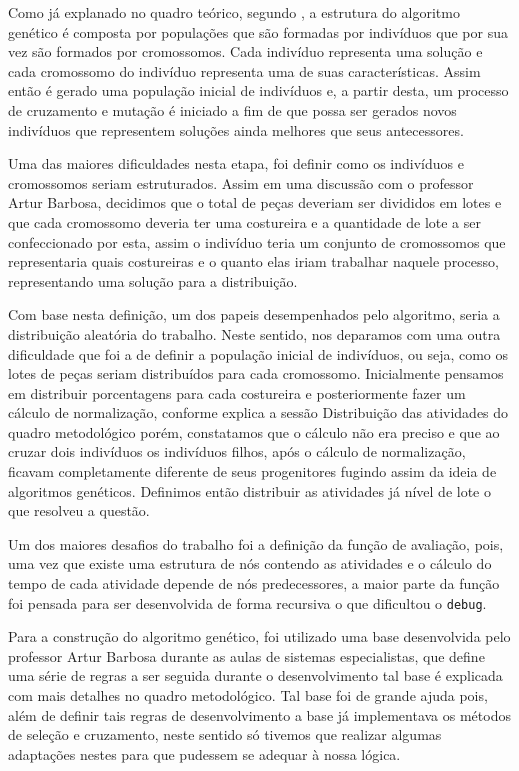 \par Como já explanado no quadro teórico, segundo , a estrutura do algoritmo genético é composta
por populações que são formadas por indivíduos que por sua vez são formados por cromossomos.
Cada indivíduo representa uma solução e cada cromossomo do indivíduo representa uma de suas características. 
Assim então é gerado uma população inicial de indivíduos e, a partir desta, um processo de cruzamento 
e mutação é iniciado a fim de que possa ser gerados novos indivíduos que representem soluções ainda melhores 
que seus antecessores.

\par Uma das maiores dificuldades nesta etapa, foi definir como os indivíduos e cromossomos seriam estruturados. Assim em uma discussão com o professor Artur Barbosa, decidimos que o total de peças deveriam ser divididos em lotes e que cada cromossomo deveria ter uma costureira 
e a quantidade de lote a ser confeccionado por esta, assim o indivíduo teria um conjunto de cromossomos que representaria quais costureiras 
e o quanto elas iriam trabalhar naquele processo, representando uma solução para a distribuição.

\par Com base nesta definição, um dos papeis desempenhados pelo algoritmo, seria a distribuição aleatória do trabalho. Neste
sentido, nos deparamos com uma outra dificuldade que foi a de definir a população inicial de indivíduos, ou seja, 
como os lotes de peças seriam distribuídos para cada cromossomo. Inicialmente pensamos em distribuir porcentagens para cada costureira
e posteriormente fazer um cálculo de normalização, conforme explica a sessão Distribuição das atividades do quadro metodológico porém,
constatamos que o cálculo não era preciso e que ao cruzar dois indivíduos os indivíduos filhos, após o cálculo de normalização, ficavam
completamente diferente de seus progenitores fugindo assim da ideia de algoritmos genéticos. Definimos então distribuir as atividades já 
nível de lote o que resolveu a questão. 

\par Um dos maiores desafios do trabalho foi a definição da função de avaliação, pois, uma vez que existe uma estrutura de nós contendo
as atividades e o cálculo do tempo de cada atividade depende de nós predecessores, a maior parte da função foi pensada para ser 
desenvolvida de forma recursiva o que dificultou o \texttt{debug}. 

\par Para a construção do algoritmo genético, foi utilizado uma base desenvolvida pelo professor Artur Barbosa durante as aulas de sistemas especialistas, que define uma série de regras a ser seguida durante o desenvolvimento tal base é explicada com mais detalhes no quadro metodológico. Tal base foi de grande ajuda pois, além de definir tais regras de desenvolvimento a base já implementava os métodos de 
seleção e cruzamento, neste sentido só tivemos que realizar algumas adaptações nestes para que pudessem se adequar à nossa lógica.

